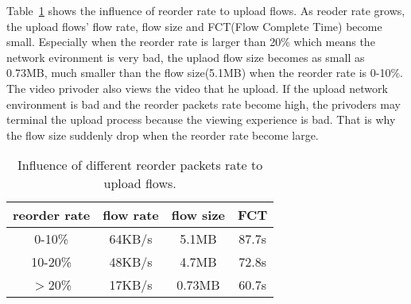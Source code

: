 Table~\ref{tbl:reorder-rate-influence} shows the influence of reorder rate to upload flows. As reoder rate grows, the upload flows' flow rate, flow size and FCT(Flow Complete Time) become small. Especially when the reorder rate is larger than 20\% which means the network evironment is very bad, the uplaod flow size becomes as small as 0.73MB, much smaller than the flow size(5.1MB) when the reorder rate is 0-10\%. The video privoder also views the video that he upload. If the upload network environment is bad and the reorder packets rate become high, the privoders may terminal the upload process because the viewing experience is bad. That is why the flow size suddenly drop when the reorder rate become large. 

\begin{table}[ht]
\tablefontsize
\renewcommand{\arraystretch}{\assize}
 \setlength{\tabcolsep}{3pt}
\caption{Influence of different reorder packets rate to upload flows.}
\centering
\begin{tabular}{c|c|c|c}
	\toprule
	 reorder rate & flow rate & flow size & FCT\\
	\hline
	0-10\% & 64KB/s & 5.1MB & 87.7s \\
	\hline
	10-20\% & 48KB/s & 4.7MB & 72.8s \\
	\hline
	$>$20\% & 17KB/s & 0.73MB & 60.7s \\
	\bottomrule
\end{tabular}
\label{tbl:reorder-rate-influence}
\termspace
\end{table}  

